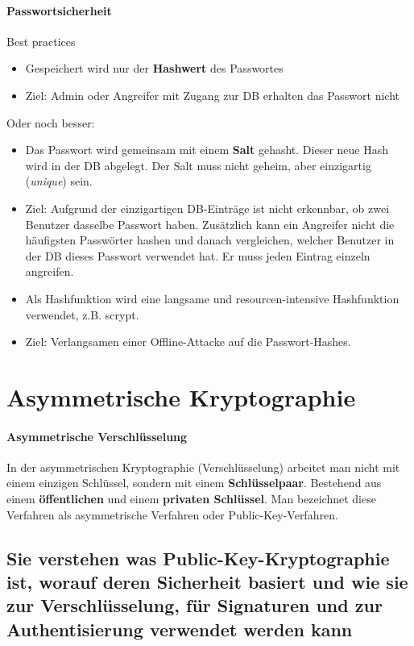 \documentclass[10pt,a4paper]{article}
\begin{document}
\paragraph*{Passwortsicherheit}Best practices
\begin{itemize}[noitemsep,topsep=0pt,leftmargin=*]
    \item Gespeichert wird nur der \textbf{Hashwert} des Passwortes
    \item Ziel: Admin oder Angreifer mit Zugang zur DB erhalten das Passwort nicht
\end{itemize}
Oder noch besser:
\begin{itemize}[noitemsep,topsep=0pt,leftmargin=*]
     \item Das Passwort wird gemeinsam mit einem \textbf{Salt} gehasht. Dieser neue Hash wird in der DB abgelegt. Der Salt muss nicht geheim, aber einzigartig (\textsl{unique}) sein.
    \item Ziel: Aufgrund der einzigartigen DB-Einträge ist nicht erkennbar, ob zwei Benutzer dasselbe Passwort haben. Zusätzlich kann ein Angreifer nicht die häufigsten Passwörter hashen und danach vergleichen, welcher Benutzer in der DB dieses Passwort verwendet hat. Er muss jeden Eintrag einzeln angreifen.
    \item Als Hashfunktion wird eine langsame und resourcen-intensive Hashfunktion verwendet, z.B. scrypt.
    \item Ziel: Verlangsamen einer Offline-Attacke auf die Passwort-Hashes.
\end{itemize}


\section{Asymmetrische Kryptographie}
\paragraph*{Asymmetrische Verschlüsselung}In der asymmetrischen Kryptographie (Verschlüsselung) arbeitet man nicht mit einem einzigen Schlüssel, sondern mit einem \textbf{Schlüsselpaar}. Bestehend aus einem \textbf{öffentlichen} und einem \textbf{privaten Schlüssel}. Man bezeichnet diese Verfahren als asymmetrische Verfahren oder \mbox{Public-Key-Verfahren}.

\subsection*{Sie verstehen was Public-Key-Kryptographie ist, worauf deren Sicherheit basiert und wie sie zur Verschlüsselung, für Signaturen und zur Authentisierung verwendet werden kann}
\end{document}
